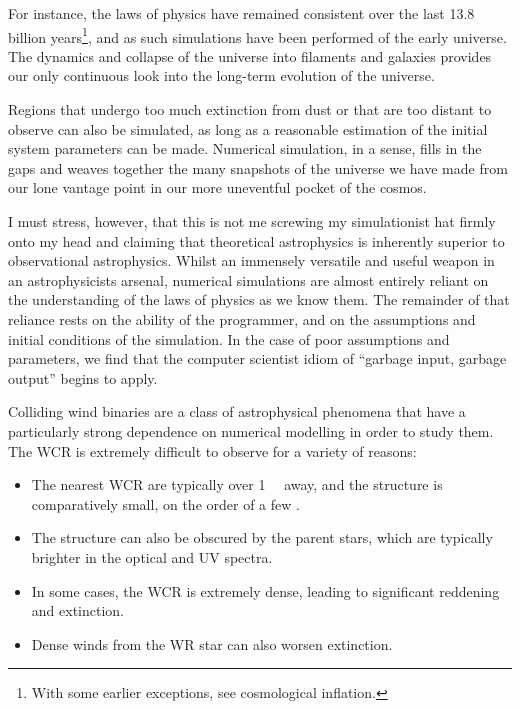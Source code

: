 For instance, the laws of physics have remained consistent over the last 13.8 billion years\footnote{With some earlier exceptions, see cosmological inflation.}, and as such simulations have been performed of the early universe.
The dynamics and collapse of the universe into filaments and galaxies provides our only continuous look into the long-term evolution of the universe.

Regions that undergo too much extinction from dust or that are too distant to observe can also be simulated, as long as a reasonable estimation of the initial system parameters can be made.
Numerical simulation, in a sense, fills in the gaps and weaves together the many snapshots of the universe we have made from our lone vantage point in our more uneventful pocket of the cosmos.

I must stress, however, that this is not me screwing my simulationist hat firmly onto my head and claiming that theoretical astrophysics is inherently superior to observational astrophysics.
Whilst an immensely versatile and useful weapon in an astrophysicists arsenal, numerical simulations are almost entirely reliant on the understanding of the laws of physics as we know them.
The remainder of that reliance rests on the ability of the programmer, and on the assumptions and initial conditions of the simulation.
In the case of poor assumptions and parameters, we find that the computer scientist idiom of ``garbage input, garbage output'' begins to apply.


Colliding wind binaries are a class of astrophysical phenomena that have a particularly strong dependence on numerical modelling in order to study them.
The WCR is extremely difficult to observe for a variety of reasons:

\begin{itemize}
  \item The nearest WCR are typically over \SI{1}{\kilo\parsec} away, and the structure is comparatively small, on the order of a few \si{\au}.
  \item The structure can also be obscured by the parent stars, which are typically brighter in the optical and UV spectra.
  \item In some cases, the WCR is extremely dense, leading to significant reddening and extinction.
  \item Dense winds from the WR star can also worsen extinction.
\end{itemize}

